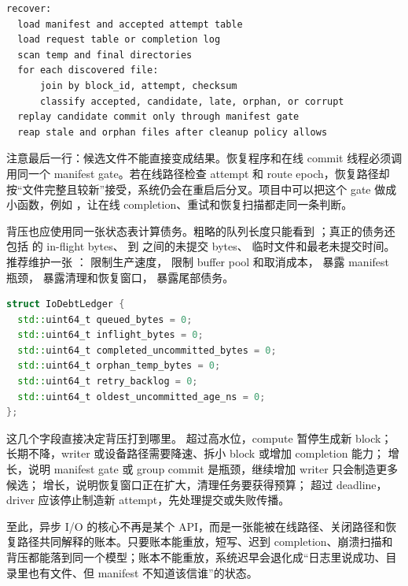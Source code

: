 \begin{lstlisting}[numbers=none,caption={恢复重放的顺序}]
recover:
  load manifest and accepted attempt table
  load request table or completion log
  scan temp and final directories
  for each discovered file:
      join by block_id, attempt, checksum
      classify accepted, candidate, late, orphan, or corrupt
  replay candidate commit only through manifest gate
  reap stale and orphan files after cleanup policy allows
\end{lstlisting}

注意最后一行：候选文件不能直接变成结果。恢复程序和在线 commit 线程必须调用同一个 manifest gate。若在线路径检查 attempt 和 route epoch，恢复路径却按“文件完整且较新”接受，系统仍会在重启后分叉。项目中可以把这个 gate 做成小函数，例如 ，让在线 completion、重试和恢复扫描都走同一条判断。

背压也应使用同一张状态表计算债务。粗略的队列长度只能看到 ；真正的债务还包括  的 in-flight bytes、 到  之间的未提交 bytes、 临时文件和最老未提交时间。推荐维护一张 ： 限制生产速度， 限制 buffer pool 和取消成本， 暴露 manifest 瓶颈， 暴露清理和恢复窗口， 暴露尾部债务。

\begin{lstlisting}[language=C++,caption={I/O 债务账本的示例形态}]
struct IoDebtLedger {
  std::uint64_t queued_bytes = 0;
  std::uint64_t inflight_bytes = 0;
  std::uint64_t completed_uncommitted_bytes = 0;
  std::uint64_t orphan_temp_bytes = 0;
  std::uint64_t retry_backlog = 0;
  std::uint64_t oldest_uncommitted_age_ns = 0;
};
\end{lstlisting}

这几个字段直接决定背压打到哪里。 超过高水位，compute 暂停生成新 block； 长期不降，writer 或设备路径需要降速、拆小 block 或增加 completion 能力； 增长，说明 manifest gate 或 group commit 是瓶颈，继续增加 writer 只会制造更多候选； 增长，说明恢复窗口正在扩大，清理任务要获得预算； 超过 deadline，driver 应该停止制造新 attempt，先处理提交或失败传播。

至此，异步 I/O 的核心不再是某个 API，而是一张能被在线路径、关闭路径和恢复路径共同解释的账本。只要账本能重放，短写、迟到 completion、崩溃扫描和背压都能落到同一个模型；账本不能重放，系统迟早会退化成“日志里说成功、目录里也有文件、但 manifest 不知道该信谁”的状态。

